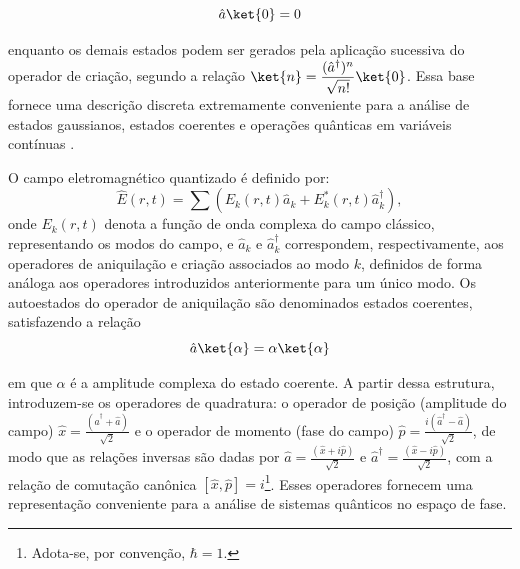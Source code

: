 \begin{equation}
    \label{eq:vaccum_state}
    \hat{a}\ket{0}=0
\end{equation} 

\noindent enquanto os demais estados podem ser gerados pela aplicação sucessiva do operador de criação, segundo a relação $\ket{n}=\displaystyle\frac{(\hat{a}^{\dagger})^n}{\sqrt{n!}}\ket{0}$. Essa base fornece uma descrição discreta extremamente conveniente para a análise de estados gaussianos, estados coerentes e operações quânticas em variáveis contínuas \cite{serafini_quantum_2023}.

O campo eletromagnético quantizado é definido por:
\begin{equation}
    \hat{E}(r,t) = \sum \left( E_k(r,t)\hat{a}_k + E_k^{*}(r,t)\hat{a}_k^{\dagger} \right),
\end{equation}
onde $E_k(r,t)$ denota a função de onda complexa do campo clássico, representando os modos do campo,  e $\hat{a}_k$ e $\hat{a}_k^{\dagger}$ 
correspondem, respectivamente, aos operadores de aniquilação e criação 
associados ao modo $k$, definidos de forma análoga aos operadores 
introduzidos anteriormente para um único modo. Os autoestados do operador de aniquilação são denominados estados coerentes, satisfazendo a relação 
\begin{equation}
    \label{eq:coherent_states}
    \hat{a}\ket{\alpha} = \alpha \ket{\alpha}
\end{equation}

\noindent em que $\alpha$ é a amplitude complexa do estado coerente. A partir dessa estrutura, introduzem-se os operadores de quadratura: o operador de posição (amplitude do campo) $\displaystyle\hat{x} = \frac{(\hat{a}^{\dagger} + \hat{a})}{\sqrt{2}}$ e o operador de momento (fase do campo) $\displaystyle\hat{p} = \frac{i(\hat{a}^{\dagger} - \hat{a})}{\sqrt{2}}$, de modo que as relações inversas são dadas por $\displaystyle\hat{a} = \frac{(\hat{x} + i\hat{p})}{\sqrt{2}}$ e $\displaystyle\hat{a}^{\dagger} = \frac{(\hat{x} - i\hat{p})}{\sqrt{2}}$, com a relação de comutação canônica $[\hat{x},\hat{p}] = i$\footnote{Adota-se, por convenção, $\hbar = 1$.}. Esses operadores fornecem uma representação conveniente para a análise de sistemas quânticos no espaço de fase.

